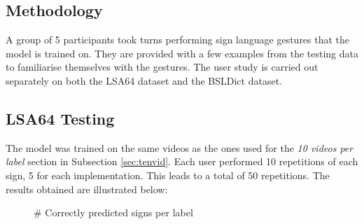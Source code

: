 \documentclass[final,rdr32.tex]{subfiles}
\begin{document}
\subsection{Methodology}

A group of 5 participants took turns performing sign language gestures that the model is trained on. They are provided with a few examples from the testing data to familiarise themselves with the gestures. The user study is carried out separately on both the LSA64 dataset and the BSLDict dataset.


\subsection{LSA64 Testing}

The model was trained on the same videos as the ones used for the \textit{10 videos per label} section in Subsection \ref{sec:tenvid}. Each user performed 10 repetitions of each sign, 5 for each implementation. This leads to a total of 50 repetitions. The results obtained are illustrated below:

\begin{figure}[H]
    \begin{center}
    \end{center}
    \caption{\# Correctly predicted signs per label}
    \label{bar:lsa64user}
\end{figure}
\end{document}

